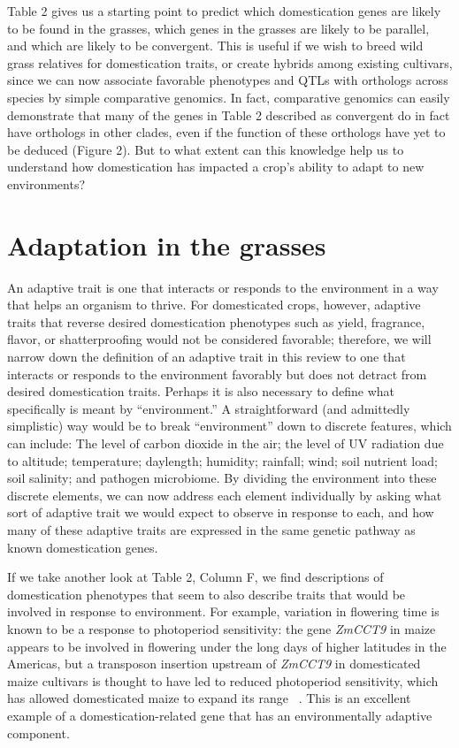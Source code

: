 \documentclass[12pt]{article}
\begin{document}
Table 2 gives us a starting point to predict which domestication genes are likely to be found in the grasses, which genes in the grasses are likely to be parallel, and which are likely to be convergent. This is useful if we wish to breed wild grass relatives for domestication traits, or create hybrids among existing cultivars, since we can now associate favorable phenotypes and QTLs with orthologs across species by simple comparative genomics. In fact, comparative genomics can easily demonstrate that many of the genes in Table 2 described as convergent do in fact have orthologs in other clades, even if the function of these orthologs have yet to be deduced (Figure 2).  But to what extent can this knowledge help us to understand how domestication has impacted a crop’s ability to adapt to new environments?
\paragraph{}

\section*{Adaptation in the grasses}
An adaptive trait is one that interacts or responds to the environment in a way that helps an organism to thrive. For domesticated crops, however, adaptive traits that reverse desired domestication phenotypes such as yield, fragrance, flavor, or shatterproofing would not be considered favorable; therefore, we will narrow down the definition of an adaptive trait in this review to one that interacts or responds to the environment favorably but does not detract from desired domestication traits.  Perhaps it is also necessary to define what specifically is meant by “environment.” A straightforward (and admittedly simplistic) way would be to break “environment” down to discrete features, which can include: The level of carbon dioxide in the air; the level of UV radiation due to altitude; temperature; daylength; humidity; rainfall; wind; soil nutrient load; soil salinity; and pathogen microbiome.  By dividing the environment into these discrete elements, we can now address each element individually by asking what sort of adaptive trait we would expect to observe in response to each, and how many of these adaptive traits are expressed in the same genetic pathway as known domestication genes. 

If we take another look at Table 2, Column F, we find descriptions of domestication phenotypes that seem to also describe traits that would be involved in response to environment. For example, variation in flowering time is known to be a response to photoperiod sensitivity: the gene \textit{ZmCCT9} in maize appears to be involved in flowering under the long days of higher latitudes in the Americas, but a transposon insertion upstream of \textit{ZmCCT9} in domesticated maize cultivars is thought to have led to reduced photoperiod sensitivity, which has allowed domesticated maize to expand its range ~\citep{Huang2017}.  This is an excellent example of a domestication-related gene that has an environmentally adaptive component. 
\end{document}
